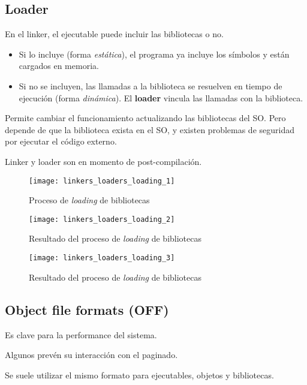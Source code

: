 \documentclass[a4paper, twoside]{article}
\begin{document}
\newpage
\subsection{Loader}

En el linker, el ejecutable puede incluir las bibliotecas o no.

\begin{itemize}
  \item Si lo incluye (forma \emph{estática}), el programa ya incluye los
  símbolos y están cargados en memoria.
  \item Si no se incluyen, las llamadas a la biblioteca se resuelven en tiempo
  de ejecución (forma \emph{dinámica}).
  El \textbf{loader} vincula las llamadas con la biblioteca.
\end{itemize}

Permite cambiar el funcionamiento actualizando las bibliotecas del SO.
Pero depende de que la biblioteca exista en el SO, y existen problemas de
seguridad por ejecutar el código externo.

Linker y loader son en momento de post-compilación.

\begin{figure}[p]
  \centering
  \texttt{[image: linkers\_loaders\_loading\_1]}
  \caption{Proceso de \textit{loading} de bibliotecas}
  \label{fig:linkers_loaders_loading_1}
\end{figure}

\begin{figure}[p]
  \centering
  \texttt{[image: linkers\_loaders\_loading\_2]}
  \caption{Resultado del proceso de \textit{loading} de bibliotecas}
  \label{fig:linkers_loaders_loading_2}
\end{figure}

\begin{figure}[p]
  \centering
  \texttt{[image: linkers\_loaders\_loading\_3]}
  \caption{Resultado del proceso de \textit{loading} de bibliotecas}
  \label{fig:linkers_loaders_loading_3}
\end{figure}

\newpage
\subsection{Object file formats (OFF)}
Es clave para la performance del sistema.

Algunos prevén su interacción con el paginado.

Se suele utilizar el mismo formato para ejecutables, objetos y bibliotecas.
\end{document}
